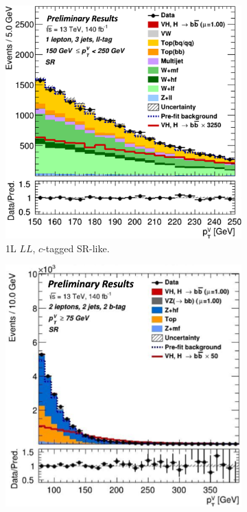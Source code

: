 \begin{figure}[h!]
\begin{subfigure}[b]{0.32\textwidth}
        \includegraphics[width=\textwidth]{Images/VH/Fit/fromSlides/Postfit/1L_LLSR.png}
        \caption{1L $LL$, $c$-tagged SR-like.}
        \label{fig:val_LLSR}
    \end{subfigure}
    \begin{subfigure}[b]{0.32\textwidth}
      \centering
      \includegraphics[width=\textwidth]{Images/VH/Fit/fromSlides/Postfit/2LBB.png}

\end{subfigure}
\end{figure}
